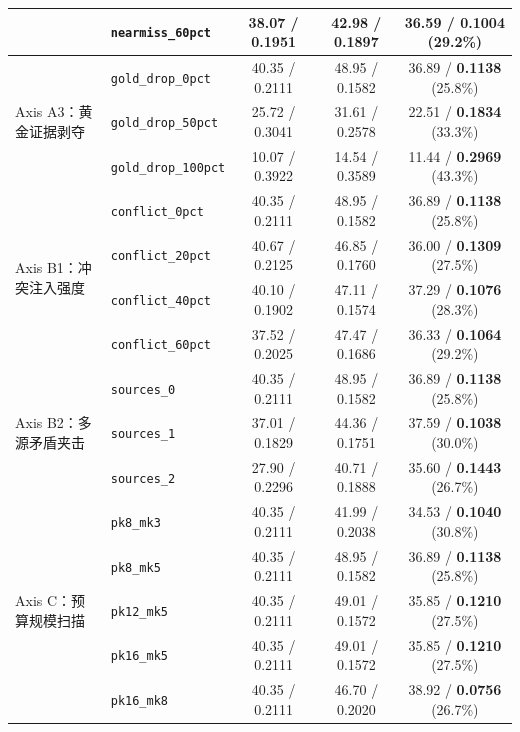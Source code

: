 \documentclass[11pt]{article}
\begin{document}
\begin{table}[t]
{{\begin{tabular}{llccc}
& \texttt{nearmiss\_60pct} & 38.07 / 0.1951 & 42.98 / 0.1897 & 36.59 / \textbf{0.1004} (29.2\%) \\
\midrule
\multirow{3}{*}{Axis A3：黄金证据剥夺}
& \texttt{gold\_drop\_0pct} & 40.35 / 0.2111 & 48.95 / 0.1582 & 36.89 / \textbf{0.1138} (25.8\%) \\
& \texttt{gold\_drop\_50pct} & 25.72 / 0.3041 & 31.61 / 0.2578 & 22.51 / \textbf{0.1834} (33.3\%) \\
& \texttt{gold\_drop\_100pct} & 10.07 / 0.3922 & 14.54 / 0.3589 & 11.44 / \textbf{0.2969} (43.3\%) \\
\midrule
\multirow{4}{*}{Axis B1：冲突注入强度}
& \texttt{conflict\_0pct} & 40.35 / 0.2111 & 48.95 / 0.1582 & 36.89 / \textbf{0.1138} (25.8\%) \\
& \texttt{conflict\_20pct} & 40.67 / 0.2125 & 46.85 / 0.1760 & 36.00 / \textbf{0.1309} (27.5\%) \\
& \texttt{conflict\_40pct} & 40.10 / 0.1902 & 47.11 / 0.1574 & 37.29 / \textbf{0.1076} (28.3\%) \\
& \texttt{conflict\_60pct} & 37.52 / 0.2025 & 47.47 / 0.1686 & 36.33 / \textbf{0.1064} (29.2\%) \\
\midrule
\multirow{3}{*}{Axis B2：多源矛盾夹击}
& \texttt{sources\_0} & 40.35 / 0.2111 & 48.95 / 0.1582 & 36.89 / \textbf{0.1138} (25.8\%) \\
& \texttt{sources\_1} & 37.01 / 0.1829 & 44.36 / 0.1751 & 37.59 / \textbf{0.1038} (30.0\%) \\
& \texttt{sources\_2} & 27.90 / 0.2296 & 40.71 / 0.1888 & 35.60 / \textbf{0.1443} (26.7\%) \\
\midrule
\multirow{5}{*}{Axis C：预算规模扫描}
& \texttt{pk8\_mk3} & 40.35 / 0.2111 & 41.99 / 0.2038 & 34.53 / \textbf{0.1040} (30.8\%) \\
& \texttt{pk8\_mk5} & 40.35 / 0.2111 & 48.95 / 0.1582 & 36.89 / \textbf{0.1138} (25.8\%) \\
& \texttt{pk12\_mk5} & 40.35 / 0.2111 & 49.01 / 0.1572 & 35.85 / \textbf{0.1210} (27.5\%) \\
& \texttt{pk16\_mk5} & 40.35 / 0.2111 & 49.01 / 0.1572 & 35.85 / \textbf{0.1210} (27.5\%) \\
& \texttt{pk16\_mk8} & 40.35 / 0.2111 & 46.70 / 0.2020 & 38.92 / \textbf{0.0756} (26.7\%) \\
\bottomrule
\end{tabular}
}}
\end{table}
\end{document}
